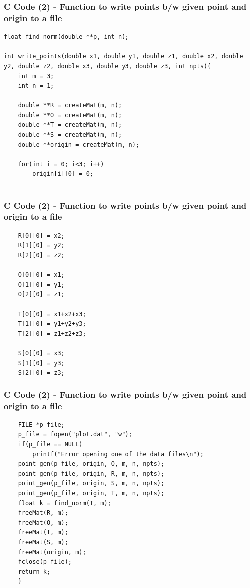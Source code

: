 \documentclass{beamer}
\begin{document}
\begin{frame}[fragile]
    \frametitle{C Code (2) - Function to write points b/w given point and origin to a file}

    \begin{lstlisting}
float find_norm(double **p, int n);

int write_points(double x1, double y1, double z1, double x2, double y2, double z2, double x3, double y3, double z3, int npts){
    int m = 3;
    int n = 1;

    double **R = createMat(m, n);
    double **O = createMat(m, n);
    double **T = createMat(m, n);
    double **S = createMat(m, n);
    double **origin = createMat(m, n);

    for(int i = 0; i<3; i++)
        origin[i][0] = 0; 
    

    \end{lstlisting}
\end{frame}
\begin{frame}[fragile]
    \frametitle{C Code (2) - Function to write points b/w given point and origin to a file}

    \begin{lstlisting}
    R[0][0] = x2;
    R[1][0] = y2;
    R[2][0] = z2;

    O[0][0] = x1;
    O[1][0] = y1;
    O[2][0] = z1;

    T[0][0] = x1+x2+x3;
    T[1][0] = y1+y2+y3;
    T[2][0] = z1+z2+z3;

    S[0][0] = x3;
    S[1][0] = y3;
    S[2][0] = z3;
    \end{lstlisting}
\end{frame}

\begin{frame}[fragile]
    \frametitle{C Code (2) - Function to write points b/w given point and origin to a file}

    \begin{lstlisting}
    FILE *p_file;
    p_file = fopen("plot.dat", "w");
    if(p_file == NULL)
        printf("Error opening one of the data files\n");
    point_gen(p_file, origin, O, m, n, npts);
    point_gen(p_file, origin, R, m, n, npts);
    point_gen(p_file, origin, S, m, n, npts);
    point_gen(p_file, origin, T, m, n, npts);
    float k = find_norm(T, m);
    freeMat(R, m);
    freeMat(O, m);
    freeMat(T, m);
    freeMat(S, m);
    freeMat(origin, m);
    fclose(p_file);
    return k;
    }
    \end{lstlisting}
\end{frame}
\end{document}
